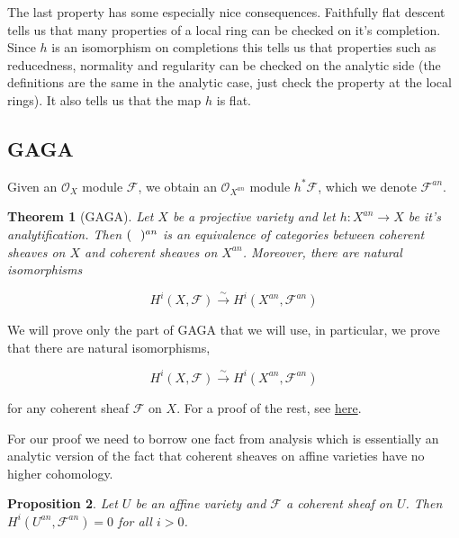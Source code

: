 \documentclass[a4paper]{article}
\newcommand{\F}{\mathcal{F}}
\newcommand{\OO}{\mathcal{O}}
\newtheorem{theorem}{Theorem}
\newtheorem{proposition}[theorem]{Proposition}
\numberwithin{theorem}{section}
\numberwithin{equation}{section}
\begin{document}
The last property has some especially nice consequences. Faithfully flat descent tells us that many properties of a local ring can be checked on it's completion. Since $h$ is an isomorphism on completions this tells us that properties such as reducedness, normality and regularity can be checked on the analytic side (the definitions are the same in the analytic case, just check the property at the local rings). It also tells us that the map $h$ is flat.

\subsection{GAGA}

Given an $\OO_X$ module $\F$, we obtain an $\OO_{X^{an}}$ module $h^* \F$, which we denote $\F^{an}$.

\begin{theorem}[GAGA] \label{GAGA}
    Let $X$ be a projective variety and let $h: X^{an} \rightarrow X$ be it's analytification. Then $(\hspace{2.5mm})^{an}$ is an equivalence of categories between coherent sheaves on $X$ and coherent sheaves on $X^{an}$. Moreover, there are natural isomorphisms

    $$ H^i(X,\mathcal{F}) \overset{\sim}{\rightarrow} H^i(X^{an},\mathcal{F}^{an}) $$
\end{theorem}


We will prove only the part of GAGA that we will use, in particular, we prove that there are natural isomorphisms,

$$ H^i(X,\mathcal{F}) \overset{\sim}{\rightarrow} H^i(X^{an},\mathcal{F}^{an})  $$

for any coherent sheaf $\F$ on $X$. For a proof of the rest, see \href{https://math.berkeley.edu/~chd/expo/GAGA.pdf}{here}. 

For our proof we need to borrow one fact from analysis which is essentially an analytic version of the fact that coherent sheaves on affine varieties have no higher cohomology.

\begin{proposition} \label{stein}
    Let $U$ be an affine variety and $\mathcal{F}$ a coherent sheaf on $U$. Then $H^i(U^{an},\F^{an}) = 0$ for all $i > 0$.
\end{proposition}
\end{document}
